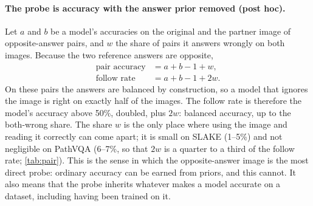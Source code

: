 \documentclass[10pt,twocolumn,letterpaper]{article}
\begin{document}
\paragraph{The probe is accuracy with the answer prior removed (post hoc).} Let $a$ and $b$ be a model's accuracies on the
original and the partner image of opposite-answer pairs, and $w$ the share of pairs it answers wrongly on both images.
Because the two reference answers are opposite,
\begin{equation}
\begin{aligned}
\text{pair accuracy}&=a+b-1+w,\\
\text{follow rate}&=a+b-1+2w .
\end{aligned}
\label{eq:identity}
\end{equation}
On these pairs the answers are balanced by construction, so a model that ignores the image is right on exactly
half of the images. The follow rate is therefore the model's accuracy above 50\%, doubled, plus $2w$: balanced
accuracy, up to the both-wrong share. The share $w$ is the only place where using the image and reading it
correctly can come apart; it is small on SLAKE (1--5\%) and not negligible on PathVQA (6--7\%, so that $2w$ is a quarter to a third
of the follow rate; \cref{tab:pair}). This is the sense in which the opposite-answer image is the most direct
probe: ordinary accuracy can be earned from priors, and this cannot. It also means that the probe inherits
whatever makes a model accurate on a dataset, including having been trained on it.
\end{document}
